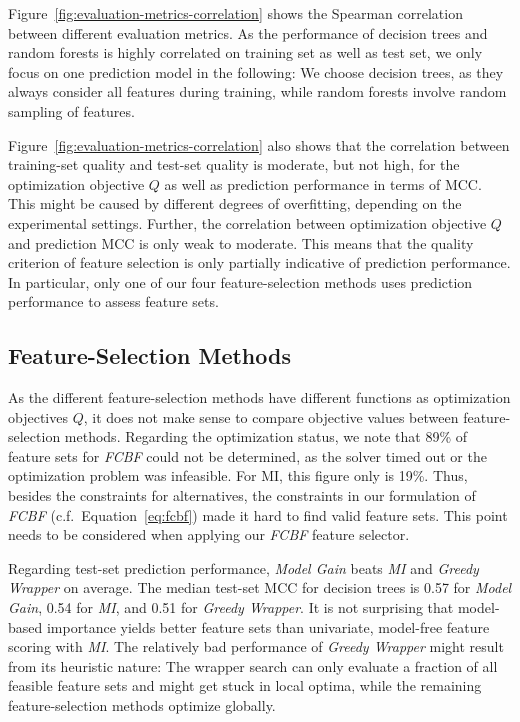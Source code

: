 \documentclass[conference]{IEEEtran}
\theoremstyle{definition}
\begin{document}
Figure~\ref{fig:evaluation-metrics-correlation} shows the Spearman correlation between different evaluation metrics.
As the performance of decision trees and random forests is highly correlated on training set as well as test set, we only focus on one prediction model in the following:
We choose decision trees, as they always consider all features during training, while random forests involve random sampling of features.

Figure~\ref{fig:evaluation-metrics-correlation} also shows that the correlation between training-set quality and test-set quality is moderate, but not high, for the optimization objective $Q$ as well as prediction performance in terms of MCC.
This might be caused by different degrees of overfitting, depending on the experimental settings.
Further, the correlation between optimization objective $Q$ and prediction MCC is only weak to moderate.
This means that the quality criterion of feature selection is only partially indicative of prediction performance.
In particular, only one of our four feature-selection methods uses prediction performance to assess feature sets.

\subsection{Feature-Selection Methods}

As the different feature-selection methods have different functions as optimization objectives $Q$, it does not make sense to compare objective values between feature-selection methods.
Regarding the optimization status, we note that 89\% of feature sets for \emph{FCBF} could not be determined, as the solver timed out or the optimization problem was infeasible.
For MI, this figure only is 19\%.
Thus, besides the constraints for alternatives, the constraints in our formulation of \emph{FCBF} (c.f.~Equation~\ref{eq:fcbf}) made it hard to find valid feature sets.
This point needs to be considered when applying our \emph{FCBF} feature selector.

Regarding test-set prediction performance, \emph{Model Gain} beats \emph{MI} and \emph{Greedy Wrapper} on average.
The median test-set MCC for decision trees is 0.57 for \emph{Model Gain}, 0.54 for \emph{MI}, and 0.51 for \emph{Greedy Wrapper}.
It is not surprising that model-based importance yields better feature sets than univariate, model-free feature scoring with \emph{MI}.
The relatively bad performance of \emph{Greedy Wrapper} might result from its heuristic nature:
The wrapper search can only evaluate a fraction of all feasible feature sets and might get stuck in local optima, while the remaining feature-selection methods optimize globally.
\end{document}
